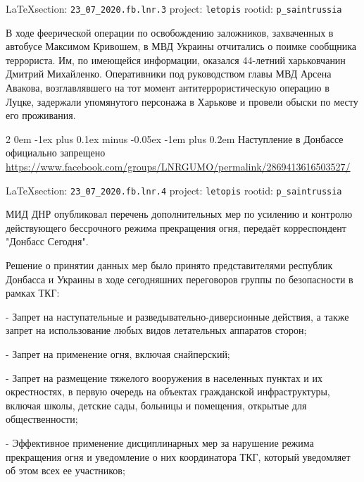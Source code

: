 \documentclass[a4paper,11pt]{extreport}
\makeatletter
\renewcommand\subsection{%
  \clearpage
    \@startsection{subsection}%
    {2}%
    {0em}%
    {-1ex plus 0.1ex minus -0.05ex}%
    {-1em plus 0.2em}%
    {\scshape\bfseries\Large}%
}
\makeatother
\begin{document}
\vspace{0.5cm}
{\small\LaTeX section: \verb|23_07_2020.fb.lnr.3| project: \verb|letopis| rootid: \verb|p_saintrussia|}
\vspace{0.5cm}

В ходе феерической операции по освобождению заложников, захваченных в автобусе
Максимом Кривошем, в МВД Украины отчитались о поимке сообщника террориста. Им,
по имеющейся информации, оказался 44-летний харьковчанин Дмитрий Михайленко.
Оперативники под руководством главы МВД Арсена Авакова, возглавлявшего на тот
момент антитеррористическую операцию в Луцке, задержали упомянутого персонажа в
Харькове и провели обыски по месту его проживания. 
 
 
\subsection{Наступление в Донбассе официально запрещено}
\label{sec:23_07_2020.fb.lnr.4}
\url{https://www.facebook.com/groups/LNRGUMO/permalink/2869413616503527/}

\vspace{0.5cm}
{\small\LaTeX section: \verb|23_07_2020.fb.lnr.4| project: \verb|letopis| rootid: \verb|p_saintrussia|}
\vspace{0.5cm}

МИД ДНР опубликовал перечень дополнительных мер по усилению и контролю
действующего бессрочного режима прекращения огня, передаёт корреспондент
"Донбасс Сегодня".

Решение о принятии данных мер было принято представителями республик Донбасса и
Украины в ходе сегодняшних переговоров группы по безопасности в рамках ТКГ:

- Запрет на наступательные и разведывательно-диверсионные действия, а также
запрет на использование любых видов летательных аппаратов сторон;

- Запрет на применение огня, включая снайперский;

- Запрет на размещение тяжелого вооружения в населенных пунктах и их
окрестностях, в первую очередь на объектах гражданской инфраструктуры, включая
школы, детские сады, больницы и помещения, открытые для общественности;

- Эффективное применение дисциплинарных мер за нарушение режима прекращения
огня и уведомление о них координатора ТКГ, который уведомляет об этом всех ее
участников;
\end{document}
